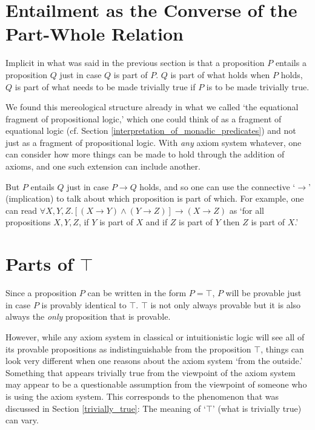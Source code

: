 \documentclass[12pt]{book}
\begin{document}
\section{Entailment as the Converse of the Part-Whole Relation} \label{entailment_as_converse}
Implicit in what was said in the previous section is that a proposition $P$ entails a proposition $Q$ just in case $Q$ is part of $P$. $Q$ is part of what holds when $P$ holds, $Q$ is part of what needs to be made trivially true if $P$ is to be made trivially true.

We found this mereological structure already in what we called `the equational fragment of propositional logic,' which one could think of as a fragment of equational logic (cf. Section \ref{interpretation_of_monadic_predicates}) and not just as a fragment of propositional logic. With \textit{any} axiom system whatever, one can consider how more things can be made to hold through the addition of axioms, and one such extension can include another.

But $P$ entails $Q$ just in case $P \rightarrow Q$ holds, and so one can use the connective `$\rightarrow$' (implication) to talk about which proposition is part of which. For example, one can read $\forall X, Y, Z.[(X \rightarrow Y) \wedge (Y \rightarrow Z)] \rightarrow (X \rightarrow Z)$ as `for all propositions $X, Y, Z$, if $Y$ is part of $X$ and if $Z$ is part of $Y$ then $Z$ is part of $X$.'

\section{Parts of $\top$} \label{parts_of_top}
Since a proposition $P$ can be written in the form $P = \top$, $P$ will be provable just in case $P$ is provably identical to $\top$. $\top$ is not only always provable but it is also always the \textit{only} proposition that is provable.

However, while any axiom system in classical or intuitionistic logic will see all of its provable propositions as indistinguishable from the proposition $\top$, things can look very different when one reasons about the axiom system `from the outside.' Something that appears trivially true from the viewpoint of the axiom system may appear to be a questionable assumption from the viewpoint of someone who is using the axiom system. This corresponds to the phenomenon that was discussed in Section \ref{trivially_true}: The meaning of `$\top$' (what is trivially true) can vary.
\end{document}
